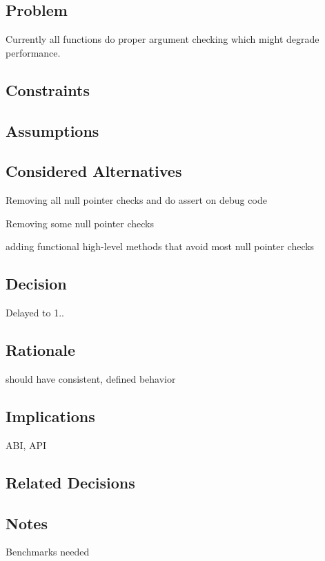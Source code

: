 \subsection*{Problem}

Currently all functions do proper argument checking which might degrade performance.

\subsection*{Constraints}

\subsection*{Assumptions}

\subsection*{Considered Alternatives}


\begin{DoxyItemize}
\item Removing all null pointer checks and do assert on debug code
\item Removing some null pointer checks
\item adding functional high-\/level methods that avoid most null pointer checks
\end{DoxyItemize}

\subsection*{Decision}

Delayed to 1..

\subsection*{Rationale}


\begin{DoxyItemize}
\item should have consistent, defined behavior
\end{DoxyItemize}

\subsection*{Implications}


\begin{DoxyItemize}
\item A\+BI, A\+PI
\end{DoxyItemize}

\subsection*{Related Decisions}

\subsection*{Notes}


\begin{DoxyItemize}
\item Benchmarks needed 
\end{DoxyItemize}